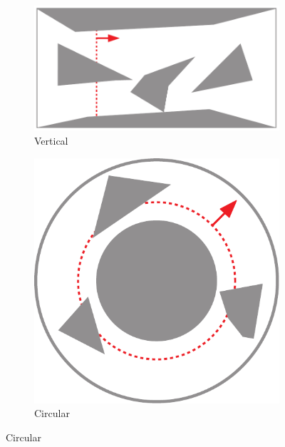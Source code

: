 \begin{figure}[t]
    \begin{subfigure}[t]{0.4\textwidth}
         \centering
         \includegraphics[width=\textwidth]{chapters/sc/fig/vertical-eps-converted-to.pdf}
         \caption{Vertical}
         \label{fig:sc-vertical}
     \end{subfigure}
    \begin{subfigure}[t]{0.2\textwidth}
         \centering
         \includegraphics[width=\textwidth]{chapters/sc/fig/circular-eps-converted-to.pdf}
         \caption{Circular}
         \label{fig:sc-radial}
     \end{subfigure}

\end{figure}
